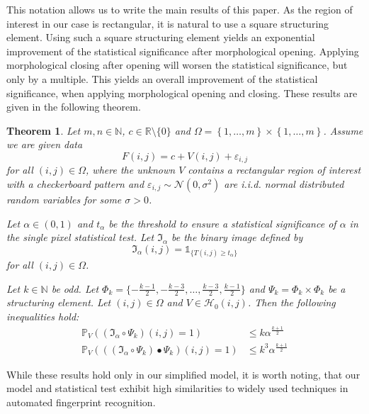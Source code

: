 \documentclass[a4paper,12pt]{article}
\theoremstyle{plain}
\newtheorem{theorem}{Theorem}[section]
\theoremstyle{definition}
\begin{document}
This notation allows us to write the main results of this paper. As the region of interest in our case is rectangular, it is natural to use a square structuring element. Using such a square structuring element yields an exponential improvement of the statistical significance after morphological opening. Applying morphological closing after opening will worsen the statistical significance, but only by a multiple. This yields an overall improvement of the statistical significance, when applying morphological opening and closing. These results are given in the following theorem.
\begin{theorem}
	Let $m, n \in \mathbb{N}$, $c \in \mathbb{R} \setminus \{ 0 \}$ and $\Omega = \left\{ 1, \dots, m \right\} \times \left\{ 1, \dots, m \right\}$. Assume we are given data
	\begin{equation*}
		F(i, j) = c + V(i, j) + \varepsilon_{i, j}
	\end{equation*}
	for all $(i, j) \in \Omega$, where the unknown $V$ contains a rectangular region of interest with a checkerboard pattern and $\varepsilon_{i, j} \sim \mathcal{N}(0, \sigma^2)$ are i.i.d. normal distributed random variables for some $\sigma > 0$.
	
	Let $\alpha \in (0, 1)$ and $t_\alpha$ be the threshold to ensure a statistical significance of $\alpha$ in the single pixel statistical test. Let $\mathfrak{I}_\alpha$ be the binary image defined by
	\begin{equation*}
		\mathfrak{I}_\alpha(i, j) = \mathds{1}_{ \{ T(i, j) \geq t_\alpha \} }
	\end{equation*}
	for all $(i, j) \in \Omega$.
	
	Let $k \in \mathbb{N}$ be odd. Let $\Phi_k = \{ -\frac{k - 1}{2}, -\frac{k - 3}{2}, \dots, \frac{k - 3}{2}, \frac{k - 1}{2} \}$ and $\Psi_k = \Phi_k \times \Phi_k$ be a structuring element. Let $(i, j) \in \Omega$ and $V \in \mathcal{H}_0(i, j)$.
	Then the following inequalities hold:
	\begin{align}
		\mathbb{P}_V( (\mathfrak{I}_\alpha \circ \Psi_k)(i, j) = 1 ) &\leq k \alpha^{\frac{k+1}{2}} \\
		\mathbb{P}_V( ( (\mathfrak{I}_\alpha \circ \Psi_k) \bullet \Psi_k)(i, j) = 1 ) &\leq k^3 \alpha^{\frac{k+1}{2}}
	\end{align}
\end{theorem}

While these results hold only in our simplified model, it is worth noting, that our model and statistical test exhibit high similarities to widely used techniques in automated fingerprint recognition.
\end{document}
